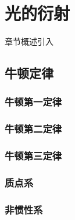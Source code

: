 \chapter{光的衍射}\label{3}

章节概述引入

\section{牛顿定律}\label{3-1}

\subsection{牛顿第一定律}\label{3-1-1}

\subsection{牛顿第二定律}\label{3-1-2}

\subsection{牛顿第三定律}\label{3-1-3}

\subsection{质点系}\label{3-1-4}

\subsection{非惯性系}\label{3-1-5}